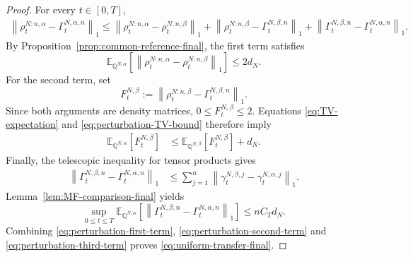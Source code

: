 \documentclass[10pt,a4paper,reqno]{amsart}
\numberwithin{equation}{section}
\theoremstyle{plain}
\theoremstyle{definition}
\theoremstyle{remark}
\newcommand{\E}{\mathbb E}
\newcommand{\Q}{\mathbb Q}
\newcommand{\1}{\mathbf 1}
\begin{document}
\begin{proof}
For every \(t\in[0,T]\),
\begin{align}
  \left\|
    \rho_t^{N:n,\alpha}
    -
    \Gamma_t^{N,\alpha,n}
  \right\|_1
  \le
  \left\|
    \rho_t^{N:n,\alpha}
    -
    \rho_t^{N:n,\beta}
  \right\|_1
  +
  \left\|
    \rho_t^{N:n,\beta}
    -
    \Gamma_t^{N,\beta,n}
  \right\|_1+
  \left\|
    \Gamma_t^{N,\beta,n}
    -
    \Gamma_t^{N,\alpha,n}
  \right\|_1.
  \label{eq:perturbation-three-terms}
\end{align}
By Proposition~\ref{prop:common-reference-final}, the first term satisfies
\begin{equation}
  \E_{\Q^{N,\alpha}}
  \left[
    \left\|
      \rho_t^{N:n,\alpha}
      -
      \rho_t^{N:n,\beta}
    \right\|_1
  \right]
  \le
  2d_N.
  \label{eq:perturbation-first-term}
\end{equation}
For the second term, set
\[
  F_t^{N,\beta}
  :=
  \left\|
    \rho_t^{N:n,\beta}
    -
    \Gamma_t^{N,\beta,n}
  \right\|_1.
\]
Since both arguments are density matrices,
\(
  0\le F_t^{N,\beta}\le2.
\)
Equations
\eqref{eq:TV-expectation} and
\eqref{eq:perturbation-TV-bound} therefore imply
\begin{equation}
\begin{aligned}
  \E_{\Q^{N,\alpha}}
  \left[
    F_t^{N,\beta}
  \right]
  &\le
  \E_{\Q^{N,\beta}}
  \left[
    F_t^{N,\beta}
  \right]
  +
  d_N.
\end{aligned}
  \label{eq:perturbation-second-term}
\end{equation}
Finally, the telescopic inequality for tensor products gives
\begin{equation}
\begin{aligned}
  \left\|
    \Gamma_t^{N,\beta,n}
    -
    \Gamma_t^{N,\alpha,n}
  \right\|_1
  &\le
  \sum_{j=1}^n
  \left\|
    \gamma_t^{N,\beta,j}
    -
    \gamma_t^{N,\alpha,j}
  \right\|_1.
\end{aligned}
  \label{eq:perturbation-tensor-telescopic}
\end{equation}
Lemma~\ref{lem:MF-comparison-final} yields
\begin{equation}
  \sup_{0\le t\le T}
  \E_{\Q^{N,\alpha}}
  \left[
    \left\|
      \Gamma_t^{N,\beta,n}
      -
      \Gamma_t^{N,\alpha,n}
    \right\|_1
  \right]
  \le
  nC_Td_N.
  \label{eq:perturbation-third-term}
\end{equation}
Combining
\eqref{eq:perturbation-first-term},
\eqref{eq:perturbation-second-term} and
\eqref{eq:perturbation-third-term} proves
\eqref{eq:uniform-transfer-final}.
\end{proof}
\end{document}
